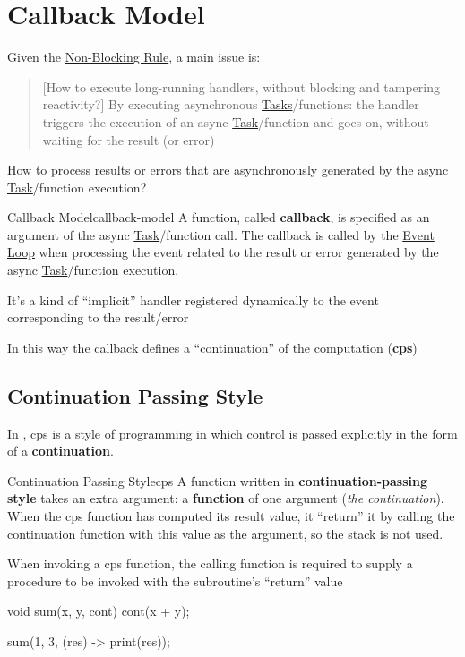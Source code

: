\section{Callback Model}\label{sec:rs_callback_model} %
Given the \hyperref[sub:rs_never_blocking_rule_and_concurrency]{Non-Blocking Rule}, a main issue is:
\begin{quote}[How to execute long-running handlers, without blocking and tampering reactivity?]
    By executing asynchronous \hyperref[def:task]{Tasks}/functions: the handler triggers the execution of an async \hyperref[def:task]{Task}/function and goes on, without waiting for the result (or error)
\end{quote}
\begin{warning}[Problem]
    How to process results or errors that are asynchronously generated by the async \hyperref[def:task]{Task}/function execution?
    \begin{tip}
    \end{tip}
\end{warning}
\begin{definition}{Callback Model}{callback-model}
    A function, called \textbf{callback}, is specified as an argument of the async \hyperref[def:task]{Task}/function call.
    The callback is called by the \hyperref[sec:rs_event_loop]{Event Loop} when processing the event related to the result or error generated by the async \hyperref[def:task]{Task}/function execution.
    \begin{note}
        It's a kind of ``implicit'' handler registered dynamically to the event corresponding to the result/error
    \end{note}
\end{definition}
\begin{note}
    In this way the callback defines a ``continuation'' of the computation (\textbf{\ac{cps}})
\end{note}
%
\subsection{Continuation Passing Style}\label{sub:rs_continuation_passing_style} %
In , \acf{cps} is a style of programming in which control is passed explicitly in the form of a \textbf{continuation}.
\begin{definition}{Continuation Passing Style}{cps}
    A function written in \textbf{continuation-passing style} takes an extra argument: a \textbf{function} of one argument (\textit{the continuation}).
    When the \ac{cps} function has computed its result value, it ``return'' it by calling the continuation function with this value as the argument, so the stack is not used.
    \begin{note}[Actually]
        When invoking a \ac{cps} function, the calling function is required to supply a procedure to be invoked with the subroutine's ``return'' value
    \end{note}
    \begin{codeblock}[java]{}
    void sum(x, y, cont) {
        cont(x + y);
    }

    sum(1, 3, (res) -> print(res));
    \end{codeblock}
\end{definition}

